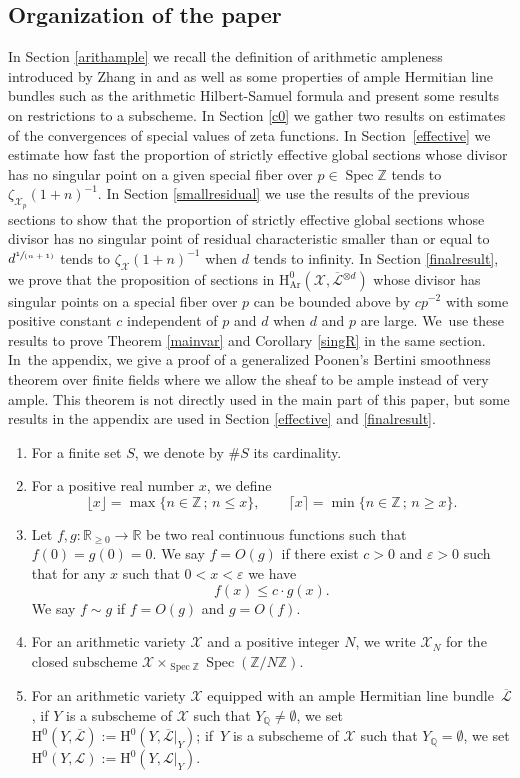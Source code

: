 \documentclass[JEP,XML,SOM,Unicode,published]{cedram}
\newcommand{\spfrac}[2]{\sfrac{#1}{(#2)}}
\newcommand{\sep}{\,;\,}
\theoremstyle{plain}
\theoremstyle{definition}
\newcommand{\ho}{\mathrm{H}}
\newcommand{\X}{\mathcal{X}}
\newcommand{\Li}{\overline{\mathcal{L}}{}}
\newcommand{\li}{\mathcal{L}}
\newcommand{\Q}{\mathbb{Q}}
\newcommand{\Z}{\mathbb{Z}}
\newcommand{\R}{\mathbb{R}}
\DeclareMathOperator{\Spec}{Spec}
\begin{document}
\subsection{Organization of the paper}
In Section \ref{arithample} we recall the definition of arithmetic ampleness introduced by Zhang in \cite{Zh92} and \cite{Zh95} as well as some properties of ample Hermitian line bundles such as the arithmetic Hilbert-Samuel formula and present some results on restrictions to a subscheme. In Section \ref{c0} we gather two results on estimates of the convergences of special values of zeta functions. In Section~\ref{effective} we estimate how fast the proportion of strictly effective global sections whose divisor has no singular point on a given special fiber over $p\in \Spec \Z$ tends to $\zeta_{\X_p}(1+n)^{-1}$. In Section \ref{smallresidual} we use the results of the previous sections to show that the proportion of strictly effective global sections whose divisor has no singular point of residual characteristic smaller than or equal to $d^{\spfrac{1}{n+1}}$ tends to $\zeta_{\X}(1+n)^{-1}$ when $d$ tends to infinity. In Section \ref{finalresult}, we prove that the proposition of sections in $\ho^0_{\mathrm{Ar}}(\X, \Li^{\otimes d})$ whose divisor has singular points on a special fiber over $p$ can be bounded above by $cp^{-2}$ with some positive constant $c$ independent of $p$ and $d$ when $d$ and $p$ are large. We~use these results to prove Theorem \ref{mainvar} and Corollary \ref{singR} in the same section. In~the appendix, we give a proof of a generalized Poonen's Bertini smoothness theorem over finite fields where we allow the sheaf to be ample instead of very ample. This theorem is not directly used in the main part of this paper, but some results in the appendix are used in Section \ref{effective} and \ref{finalresult}.

\begin{enumerate}
\item For a finite set $S$, we denote by $\#S$ its cardinality.
\item For a positive real number $x$, we define
\[
\lfloor x\rfloor= \max\{ n\in \Z\sep n\leq x \},\qquad
\lceil x\rceil = \min\{ n\in \Z\sep n\geq x \}.
\]
\item Let $f,g: \R_{\geq 0}\to \R$ be two real continuous functions such that $f(0)=g(0)=0$. We say $f=O(g)$ if there exist $c>0$ and $\varepsilon>0$ such that for any $x$ such that $0<x<\varepsilon$ we have
\[
f(x)\leq c\cdot g(x).
\]
We say $f\sim g$ if $f=O(g)$ and $g=O(f)$.
\item For an arithmetic variety $\X$ and a positive integer $N$, we write $\X_N$ for the closed subscheme $\X\times_{\Spec \Z}\Spec(\Z/N\Z)$.
\item For an arithmetic variety $\X$ equipped with an ample Hermitian line bundle~$\Li$, if $Y$ is a subscheme of $\X$ such that $Y_{\Q}\not=\emptyset$, we set $\ho^0(Y,\Li):=\ho^0(Y, \Li|_Y)$; if~$Y$ is a subscheme of $\X$ such that $Y_{\Q}=\emptyset$, we set $\ho^0(Y,\li):=\ho^0(Y, \li|_Y)$.
\end{enumerate}
\end{document}
